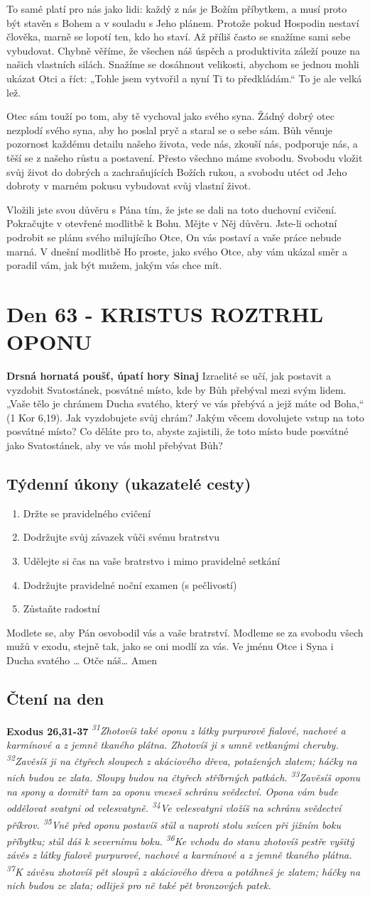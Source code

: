 \documentclass[11pt]{article}
\newcommand{\zacatekDevatyTyden}{
\textbf{Drsná hornatá poušť, úpatí hory Sinaj} \newline 
Izraelité se učí, jak postavit a vyzdobit Svatostánek, posvátné místo, kde by Bůh přebýval mezi svým lidem. „Vaše tělo je chrámem Ducha svatého, který ve vás přebývá a jejž máte od Boha,“ (1 Kor 6,19). Jak vyzdobujete svůj chrám? Jakým věcem dovolujete vstup na toto posvátné místo? Co děláte pro to, abyste zajistili, že toto místo bude posvátné jako Svatostánek, aby ve vás mohl přebývat Bůh?

\subsection*{Týdenní úkony (ukazatelé cesty)}
\begin{enumerate}
  \item Držte se pravidelného cvičení
  \item Dodržujte svůj závazek vůči svému bratrstvu
  \item Udělejte si čas na vaše bratrstvo i mimo pravidelné setkání
  \item Dodržujte pravidelné noční examen (s pečlivostí)
  \item Zůstaňte radostní
\end{enumerate}
Modlete se, aby Pán osvobodil vás a vaše bratrství. \newline
Modleme se za svobodu všech mužů v exodu, stejně tak, jako se oni modlí za vás.\newline
Ve jménu Otce i Syna i Ducha svatého …  Otče náš… Amen
}
\begin{document}
To samé platí pro nás jako lidi: každý z nás je Božím příbytkem, a musí proto být stavěn s Bohem a v souladu s Jeho plánem.
Protože pokud Hospodin nestaví člověka, marně se lopotí ten, kdo ho staví. Až příliš často se snažíme sami sebe vybudovat.
Chybně věříme, že všechen náš úspěch a produktivita záleží pouze na našich vlastních silách. Snažíme se dosáhnout velikosti,
abychom se jednou mohli ukázat Otci a říct: „Tohle jsem vytvořil a nyní Ti to předkládám.“ To je ale velká lež.

Otec sám touží po tom, aby tě vychoval jako svého syna. Žádný dobrý otec nezplodí svého syna, aby ho poslal pryč a staral se o
sebe sám. Bůh věnuje pozornost každému detailu našeho života, vede nás, zkouší nás, podporuje nás, a těší se z našeho růstu a
postavení. Přesto všechno máme svobodu. Svobodu vložit svůj život do dobrých a zachraňujících Božích rukou, a svobodu utéct od
Jeho dobroty v marném pokusu vybudovat svůj vlastní život.

Vložili jste svou důvěru s Pána tím, že jste se dali na toto duchovní cvičení. Pokračujte v otevřené modlitbě k Bohu. Mějte v Něj
důvěru. Jste-li ochotní podrobit se plánu svého milujícího Otce, On vás postaví a vaše práce nebude marná. V dnešní modlitbě Ho
proste, jako svého Otce, aby vám ukázal směr a poradil vám, jak být mužem, jakým vás chce mít.


\newpage
\section{Den 63 - KRISTUS ROZTRHL OPONU}
\zacatekDevatyTyden
\subsection*{Čtení na den}
\textbf{Exodus 26,31-37}
\newline
\textit{
\textsuperscript{31}Zhotovíš také oponu z látky purpurově fialové, nachové a karmínové a z jemně tkaného plátna. Zhotovíš ji s umně vetkanými cheruby.
\textsuperscript{32}Zavěsíš ji na čtyřech sloupech z akáciového dřeva, potažených zlatem; háčky na nich budou ze zlata. Sloupy budou na čtyřech stříbrných patkách.
\textsuperscript{33}Zavěsíš oponu na spony a dovnitř tam za oponu vneseš schránu svědectví. Opona vám bude oddělovat svatyni od velesvatyně.
\textsuperscript{34}Ve velesvatyni vložíš na schránu svědectví příkrov.
\textsuperscript{35}Vně před oponu postavíš stůl a naproti stolu svícen při jižním boku příbytku; stůl dáš k severnímu boku.
\textsuperscript{36}Ke vchodu do stanu zhotovíš pestře vyšitý závěs z látky fialově purpurové, nachové a karmínové a z jemně tkaného plátna.
\textsuperscript{37}K závěsu zhotovíš pět sloupů z akáciového dřeva a potáhneš je zlatem; háčky na nich budou ze zlata; odliješ pro ně také pět bronzových patek.
}
\end{document}

